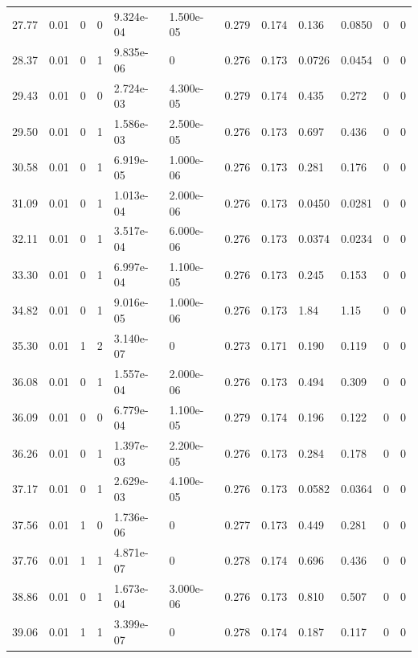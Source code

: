 \documentclass[preview]{standalone}
\begin{document}
{{{\begin{tabular}{L{1.2cm}C{1.2cm} C{0.3cm}C{0.5cm} C{1.4cm}C{1.4cm} C{1.4cm}C{1.4cm} C{1.6cm}C{1.6cm} C{1.6cm}C{1.6cm}}
  27.77  &  0.01  & 0     &  0 &  9.324e-04  & 1.500e-05  &  0.279&   0.174& 0.136 & 0.0850   &  0 & 0  \\ 
  28.37  &  0.01  & 0     &  1 &  9.835e-06  & 0  &  0.276&   0.173& 0.0726 & 0.0454   &  0 & 0  \\ 
  29.43  &  0.01  & 0     &  0 &  2.724e-03  & 4.300e-05  &  0.279&   0.174& 0.435 & 0.272   &  0 & 0  \\ 
  29.50  &  0.01  & 0     &  1 &  1.586e-03  & 2.500e-05  &  0.276&   0.173& 0.697 & 0.436   &  0 & 0  \\ 
  30.58  &  0.01  & 0     &  1 &  6.919e-05  & 1.000e-06  &  0.276&   0.173& 0.281 & 0.176   &  0 & 0  \\ 
  31.09  &  0.01  & 0     &  1 &  1.013e-04  & 2.000e-06  &  0.276&   0.173& 0.0450 & 0.0281   &  0 & 0  \\ 
  32.11  &  0.01  & 0     &  1 &  3.517e-04  & 6.000e-06  &  0.276&   0.173& 0.0374 & 0.0234   &  0 & 0  \\ 
  33.30  &  0.01  & 0     &  1 &  6.997e-04  & 1.100e-05  &  0.276&   0.173& 0.245 & 0.153   &  0 & 0  \\ 
  34.82  &  0.01  & 0     &  1 &  9.016e-05  & 1.000e-06  &  0.276&   0.173& 1.84 & 1.15   &  0 & 0  \\ 
  35.30  &  0.01  & 1     &  2 &  3.140e-07  & 0  &  0.273&   0.171& 0.190 & 0.119   &  0 & 0  \\ 
  36.08  &  0.01  & 0     &  1 &  1.557e-04  & 2.000e-06  &  0.276&   0.173& 0.494 & 0.309   &  0 & 0  \\ 
  36.09  &  0.01  & 0     &  0 &  6.779e-04  & 1.100e-05  &  0.279&   0.174& 0.196 & 0.122   &  0 & 0  \\ 
  36.26  &  0.01  & 0     &  1 &  1.397e-03  & 2.200e-05  &  0.276&   0.173& 0.284 & 0.178   &  0 & 0  \\ 
  37.17  &  0.01  & 0     &  1 &  2.629e-03  & 4.100e-05  &  0.276&   0.173& 0.0582 & 0.0364   &  0 & 0  \\ 
  37.56  &  0.01  & 1     &  0 &  1.736e-06  & 0  &  0.277&   0.173& 0.449 & 0.281   &  0 & 0  \\ 
  37.76  &  0.01  & 1     &  1 &  4.871e-07  & 0  &  0.278&   0.174& 0.696 & 0.436   &  0 & 0  \\ 
  38.86  &  0.01  & 0     &  1 &  1.673e-04  & 3.000e-06  &  0.276&   0.173& 0.810 & 0.507   &  0 & 0  \\ 
  39.06  &  0.01  & 1     &  1 &  3.399e-07  & 0  &  0.278&   0.174& 0.187 & 0.117   &  0 & 0  \\ 

\end{tabular}}}}
\end{document}
